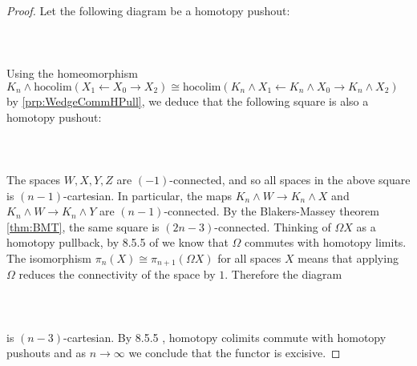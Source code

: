 \begin{prp}
\begin{proof}
Let the following diagram be a homotopy pushout:  
 \\~\\  \\~\\
Using the homeomorphism $K_n\wedge\text{hocolim}(X_1\leftarrow X_0\rightarrow X_2)\cong\text{hocolim}(K_n\wedge X_1\leftarrow K_n\wedge X_0\rightarrow K_n\wedge X_2)$ by \ref{prp:WedgeCommHPull}, we deduce that the following square is also a homotopy pushout:  
 \\~\\  \\~\\
The spaces $W,X,Y,Z$ are $(-1)$-connected, and so all spaces in the above square is $(n-1)$-cartesian. In particular, the maps $K_n\wedge W\to K_n\wedge X$ and $K_n\wedge W\to K_n\wedge Y$ are $(n-1)$-connected. By the Blakers-Massey theorem \ref{thm:BMT}, the same square is $(2n-3)$-connected. Thinking of $\Omega X$ as a homotopy pullback, by 8.5.5 of \cite{CHT} we know that $\Omega$ commutes with homotopy limits. The  isomorphism $\pi_n(X)\cong\pi_{n+1}(\Omega X)$ for all spaces $X$ means that applying $\Omega$ reduces the connectivity of the space by $1$. Therefore the diagram  
 \\~\\  \\~\\
is $(n-3)$-cartesian. By 8.5.5 \cite{CHT}, homotopy colimits commute with homotopy pushouts and as $n\to\infty$ we conclude that the functor is excisive. 
\end{proof}
\end{prp}

